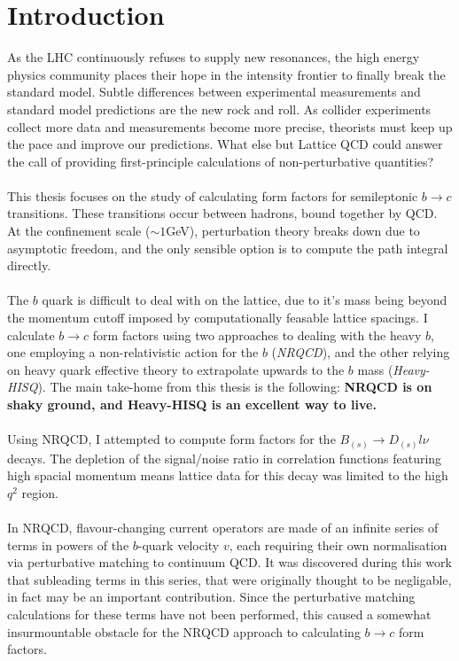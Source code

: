 \chapter{Introduction}
\label{sec:intro}

As the LHC continuously refuses to supply new resonances, the high energy physics community places their hope in the intensity frontier to finally break the standard model. Subtle differences between experimental measurements and standard model predictions are the new rock and roll. As collider experiments collect more data and measurements become more precise, theorists must keep up the pace and improve our predictions. What else but Lattice QCD could answer the call of providing first-principle calculations of non-perturbative quantities?
\\ \\
This thesis focuses on the study of calculating form factors for semileptonic $b\to c$ transitions. These transitions occur between hadrons, bound together by QCD. At the confinement scale ($\sim 1$GeV), perturbation theory breaks down due to asymptotic freedom, and the only sensible option is to compute the path integral directly.
\\ \\
The $b$ quark is difficult to deal with on the lattice, due to it's mass being beyond the momentum cutoff imposed by computationally feasable lattice spacings. I calculate $b\to c$ form factors using two approaches to dealing with the heavy $b$, one employing a non-relativistic action for the $b$ ({\textit{NRQCD}}), and the other relying on heavy quark effective theory to extrapolate upwards to the $b$ mass ({\textit{Heavy-HISQ}}). The main take-home from this thesis is the following: {\textbf{NRQCD is on shaky ground, and Heavy-HISQ is an excellent way to live.}}
\\ \\
Using NRQCD, I attempted to compute form factors for the $B_{(s)}\to D_{(s)}l\nu$ decays. The depletion of the signal/noise ratio in correlation functions featuring high spacial momentum means lattice data for this decay was limited to the high $q^2$ region.
\\ \\
In NRQCD, flavour-changing current operators are made of an infinite series of terms in powers of the $b$-quark velocity $v$, each requiring their own normalisation via perturbative matching to continuum QCD. It was discovered during this work that subleading terms in this series, that were originally thought to be negligable, in fact may be an important contribution. Since the perturbative matching calculations for these terms have not been performed, this caused a somewhat insurmountable obstacle for the NRQCD approach to calculating $b\to c$ form factors.
